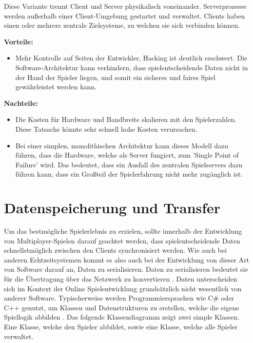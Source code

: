 Diese Variante trennt Client und Server physikalisch voneinander. Serverprozesse werden außerhalb einer Client-Umgebung gestartet und verwaltet. Clients haben einen oder mehrere zentrale Zielsysteme, zu welchen sie sich verbinden können.

\textbf{Vorteile:}
\begin{itemize}
	\item Mehr Kontrolle auf Seiten der Entwickler, Hacking ist deutlich erschwert. Die Software-Architektur kann verhindern, dass spielentscheidende Daten nicht in der Hand der Spieler liegen, und somit ein sicheres und faires Spiel gewährleistet werden kann. \cite{Smed.2002}
\end{itemize}

\textbf{Nachteile:}
\begin{itemize}
	\item Die Kosten für Hardware und Bandbreite skalieren mit den Spielerzahlen. Diese Tatsache könnte sehr schnell hohe Kosten verursachen. \cite{Deng.2018}
	\item Bei einer simplen, monolithischen Architektur kann dieses Modell dazu führen, dass die Hardware, welche als Server fungiert, zum 'Single Point of Failure' wird. Das bedeutet, dass ein Ausfall des zentralen Spielservers dazu führen kann, dass ein Großteil der Spielerfahrung nicht mehr zugänglich ist.
\end{itemize}

\section{Datenspeicherung und Transfer}

Um das bestmögliche Spielerlebnis zu erzielen, sollte innerhalb der Entwicklung von Multiplayer-Spielen darauf geachtet werden, dass spielentscheidende Daten schnellstmöglich zwischen den Clients synchronisiert werden. Wie auch bei anderen Echtzeitsystemen kommt es also auch bei der Entwicklung von dieser Art von Software darauf an, Daten zu serialisieren. Daten zu serialisieren bedeutet sie für die Übertragung über das Netzwerk zu konvertieren \cite{Wikipedia.2019}. Daten unterscheiden sich im Kontext der Online Spielentwicklung grundsätzlich nicht wesentlich von anderer Software. Typischerweise werden Programmiersprachen wie C\# oder C++ genutzt, um Klassen und Datenstrukturen zu erstellen, welche die eigene Spiellogik abbilden \cite{Glinka.2008}.  Das folgende Klassendiagramm zeigt zwei simple Klassen. Eine Klasse, welche den Spieler abbildet, sowie eine Klasse, welche alle Spieler verwaltet.

